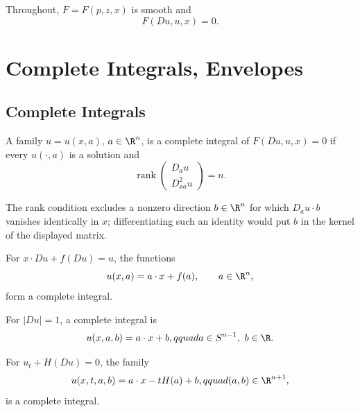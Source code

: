 Throughout, $F=F(p,z,x)$ is smooth and
\[
F(Du,u,x)=0.
\]

\section{Complete Integrals, Envelopes}
\label{sec:complete-integrals-envelopes}

\subsection{Complete Integrals}
\label{sec:complete-integrals}

\begin{definition}
\label{def:complete-integral}
A family $u=u(x,a)$, $a\in\R^n$, is a complete integral of
$F(Du,u,x)=0$ if every $u(\cdot,a)$ is a solution and
\[
\operatorname{rank}
\begin{pmatrix}D_a u\\D^2_{xa}u\end{pmatrix}=n.
\]
\end{definition}

\begin{remark}
\label{rem:complete-integral-independence}
The rank condition excludes a nonzero direction $b\in\R^n$ for which
$D_a u\cdot b$ vanishes identically in $x$; differentiating such an identity
would put $b$ in the kernel of the displayed matrix.
\end{remark}

\begin{example}
\label{ex:clairaut-complete-integral}
For $x\cdot Du+f(Du)=u$, the functions
\[
u(x,a)=a\cdot x+f(a),\qquad a\in\R^n,
\]
form a complete integral.
\end{example}

\begin{example}
\label{ex:eikonal-complete-integral}
For $|Du|=1$, a complete integral is
\[
u(x,a,b)=a\cdot x+b,qquad a\in S^{n-1},\ b\in\R.
\]
\end{example}

\begin{example}
\label{ex:hamilton-jacobi-complete-integral}
For $u_t+H(Du)=0$, the family
\[
u(x,t,a,b)=a\cdot x-tH(a)+b,qquad (a,b)\in\R^{n+1},
\]
is a complete integral.
\end{example}

